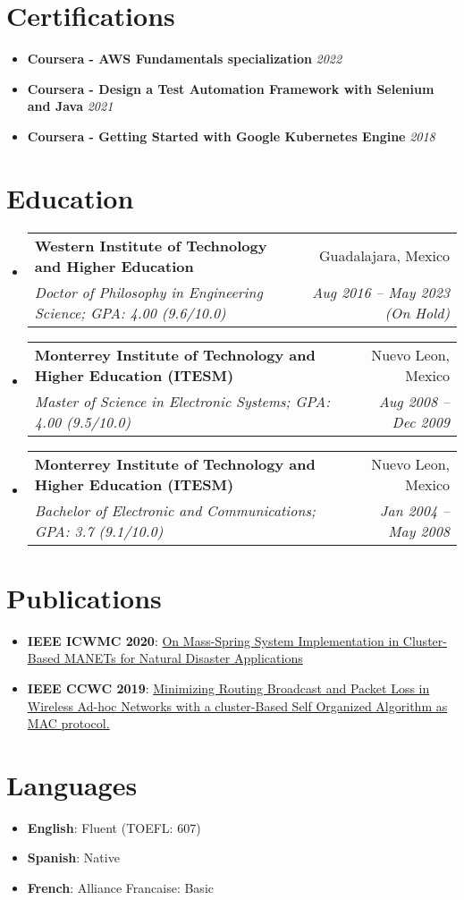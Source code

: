 \documentclass[letterpaper,11pt]{article}
\makeatletter
\newcommand{\resumeItem}[2]{
  \item\small{
    \textbf{#1}{: #2 \vspace{-2pt}}
  }
}
\newcommand{\resumeSubheading}[4]{
  \vspace{-1pt}\item
    \begin{tabular*}{0.97\textwidth}{l@{\extracolsep{\fill}}r}
      \textbf{#1} & #2 \\
      \textit{\small#3} & \textit{\small #4} \\
    \end{tabular*}\vspace{-5pt}
}
\newcommand{\resumeSubItem}[1]{
  \item\small{
    {#1 \vspace{-2pt}}
  }
}
\newcommand{\resumeSubHeadingListStart}{\begin{itemize}[leftmargin=*]}
\newcommand{\resumeSubHeadingListEnd}{\end{itemize}}
\newcommand{\resumeItemListStart}{\begin{itemize}}
\newcommand{\resumeItemListEnd}{\end{itemize}\vspace{-5pt}}
\makeatother
\begin{document}
%
\section{Certifications}
	\resumeSubHeadingListStart
		\resumeSubItem{\textbf{Coursera - AWS Fundamentals specialization} \hfill \textit{2022}}
            \resumeSubItem{\textbf{Coursera - Design a Test Automation Framework with Selenium and Java} \hfill \textit{2021}}
		\resumeSubItem{\textbf{Coursera - Getting Started with Google Kubernetes Engine} \hfill \textit{2018}}
	\resumeSubHeadingListEnd

\section{Education}
  \resumeSubHeadingListStart
  	\resumeSubheading
	  {Western Institute of Technology and Higher Education}{Guadalajara, Mexico}
	  {Doctor of Philosophy in Engineering Science; GPA: 4.00 (9.6/10.0)}{Aug 2016 -- May 2023 (On Hold)}
    \resumeSubheading
      {Monterrey Institute of Technology and Higher Education (ITESM)}{Nuevo Leon, Mexico}
      {Master of Science in Electronic Systems;  GPA: 4.00 (9.5/10.0)}{Aug 2008 -- Dec 2009}
    \resumeSubheading
      {Monterrey Institute of Technology and Higher Education (ITESM)}{Nuevo Leon, Mexico}
      {Bachelor of Electronic and Communications;  GPA: 3.7 (9.1/10.0)}{Jan 2004 -- May 2008}
  \resumeSubHeadingListEnd

%
\section{Publications}
\label{sec:Publications}
	\resumeSubHeadingListStart
		\resumeItem{IEEE ICWMC 2020}{\href{http://www.thinkmind.org/index.php?view=article&articleid=icwmc_2020_1_10_20034}{On Mass-Spring System Implementation in Cluster-Based MANETs for Natural Disaster Applications}}      
            \resumeItem{IEEE CCWC 2019}{\href{https://ieeexplore.ieee.org/document/8666583}{Minimizing Routing Broadcast and Packet Loss in Wireless Ad-hoc Networks with a cluster-Based Self Organized Algorithm as MAC protocol.}}
	\resumeSubHeadingListEnd
 
%
\section{Languages}
	\resumeSubHeadingListStart
		\resumeItem{English}{Fluent (TOEFL: 607)}
		\resumeItem{Spanish}{Native}
		\resumeItem{French}{Alliance Francaise: Basic}
	\resumeSubHeadingListEnd
\end{document}
